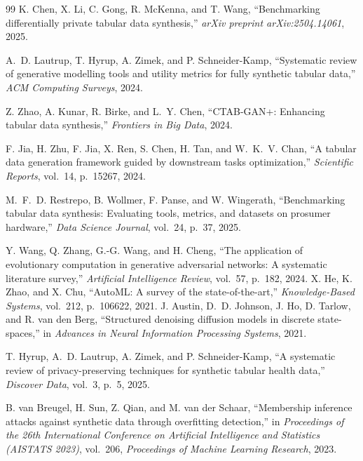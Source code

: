 \documentclass[preprint,12pt]{elsarticle}
\begin{document}
\begin{thebibliography}{99}
K. Chen, X. Li, C. Gong, R. McKenna, and T. Wang,
``Benchmarking differentially private tabular data synthesis,''
\emph{arXiv preprint arXiv:2504.14061}, 2025.

A.~D. Lautrup, T. Hyrup, A. Zimek, and P. Schneider-Kamp,
``Systematic review of generative modelling tools and utility metrics for fully synthetic tabular data,''
\emph{ACM Computing Surveys}, 2024.

Z. Zhao, A. Kunar, R. Birke, and L.~Y. Chen,
``CTAB-GAN+: Enhancing tabular data synthesis,''
\emph{Frontiers in Big Data}, 2024.

F. Jia, H. Zhu, F. Jia, X. Ren, S. Chen, H. Tan, and W.~K.~V. Chan,
``A tabular data generation framework guided by downstream tasks optimization,''
\emph{Scientific Reports}, vol.~14, p.~15267, 2024.

M.~F.~D. Restrepo, B. Wollmer, F. Panse, and W. Wingerath,
``Benchmarking tabular data synthesis: Evaluating tools, metrics, and datasets on prosumer hardware,''
\emph{Data Science Journal}, vol.~24, p.~37, 2025.

Y. Wang, Q. Zhang, G.-G. Wang, and H. Cheng,
``The application of evolutionary computation in generative adversarial networks: A systematic literature survey,''
\emph{Artificial Intelligence Review}, vol.~57, p.~182, 2024.
X. He, K. Zhao, and X. Chu,
``AutoML: A survey of the state-of-the-art,''
\emph{Knowledge-Based Systems}, vol.~212, p.~106622, 2021.
J. Austin, D.~D. Johnson, J. Ho, D. Tarlow, and R. van den Berg,
``Structured denoising diffusion models in discrete state-spaces,''
in \emph{Advances in Neural Information Processing Systems}, 2021.

T. Hyrup, A.~D. Lautrup, A. Zimek, and P. Schneider-Kamp,
``A systematic review of privacy-preserving techniques for synthetic tabular health data,''
\emph{Discover Data}, vol.~3, p.~5, 2025.

B. van Breugel, H. Sun, Z. Qian, and M. van der Schaar,
``Membership inference attacks against synthetic data through overfitting detection,''
in \emph{Proceedings of the 26th International Conference on Artificial Intelligence and Statistics (AISTATS 2023)},
vol.~206, \emph{Proceedings of Machine Learning Research}, 2023.


\end{thebibliography}
\end{document}
